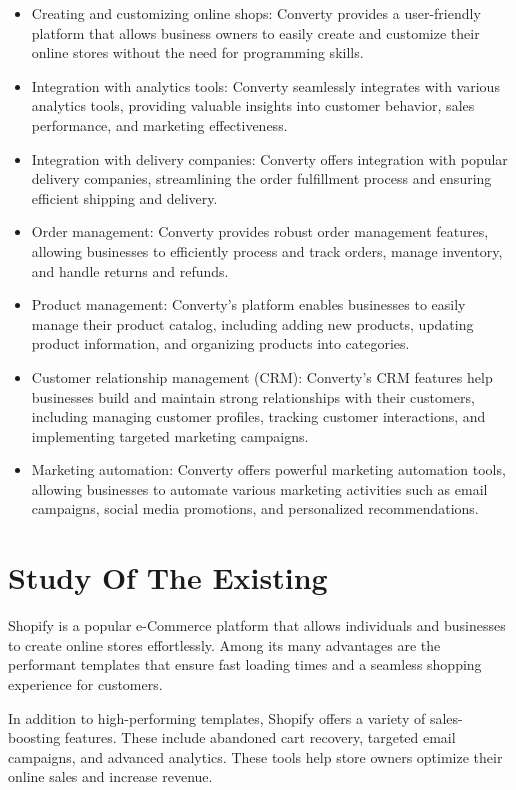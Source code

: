 \begin{itemize}
  \item Creating and customizing online shops: Converty provides a user-friendly platform that allows business owners to easily create and customize their online stores without the need for programming skills.
  \item Integration with analytics tools: Converty seamlessly integrates with various analytics tools, providing valuable insights into customer behavior, sales performance, and marketing effectiveness.
  \item Integration with delivery companies: Converty offers integration with popular delivery companies, streamlining the order fulfillment process and ensuring efficient shipping and delivery.
  \item Order management: Converty provides robust order management features, allowing businesses to efficiently process and track orders, manage inventory, and handle returns and refunds.
  \item Product management: Converty's platform enables businesses to easily manage their product catalog, including adding new products, updating product information, and organizing products into categories.
  \item Customer relationship management (CRM): Converty's CRM features help businesses build and maintain strong relationships with their customers, including managing customer profiles, tracking customer interactions, and implementing targeted marketing campaigns.
  \item Marketing automation: Converty offers powerful marketing automation tools, allowing businesses to automate various marketing activities such as email campaigns, social media promotions, and personalized recommendations.
\end{itemize}

\section{Study Of The Existing}
Shopify is a popular e-Commerce platform that allows individuals and businesses to create online stores effortlessly. Among its many advantages are the performant templates that ensure fast loading times and a seamless shopping experience for customers.
\newline

In addition to high-performing templates, Shopify offers a variety of sales-boosting features. These include abandoned cart recovery, targeted email campaigns, and advanced analytics. These tools help store owners optimize their online sales and increase revenue.
\newline

